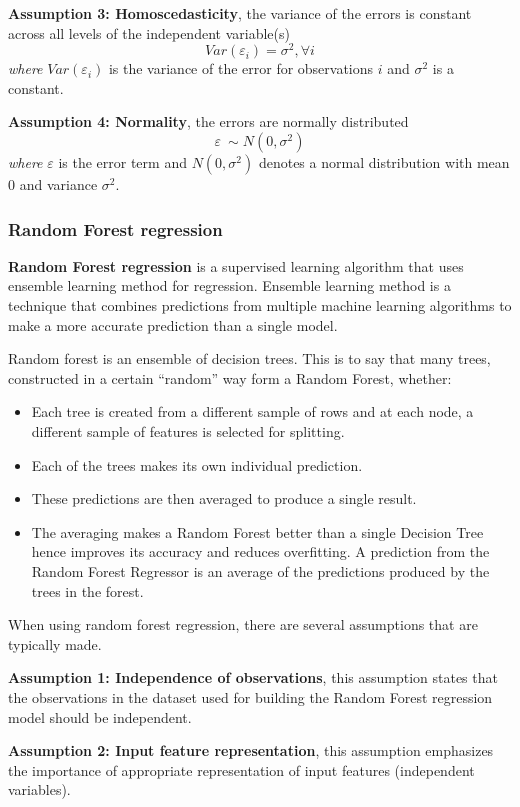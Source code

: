 \textbf{Assumption 3: Homoscedasticity}, the variance of the errors is constant across all levels of the independent variable(s)
$$
Var({\varepsilon}_{i})=\sigma ^{2},\forall i
$$
\textit{where} $Var({\varepsilon}_{i})$ is the variance of the error for observations $i$ and $\sigma ^{2}$ is a constant.

\textbf{Assumption 4: Normality}, the errors are normally distributed
$$
\varepsilon ~ \sim N(0,\sigma ^{2})
$$
\textit{where} $\varepsilon$ is the error term and $N(0,\sigma ^{2})$ denotes a normal distribution with mean 0 and variance $\sigma ^{2}$.
\subsubsection{Random Forest regression}
\textbf{Random Forest regression} is a supervised learning algorithm that uses ensemble learning method for regression. Ensemble learning method is a technique that combines predictions from multiple machine learning algorithms to make a more accurate prediction than a single model.

Random forest is an ensemble of decision trees. This is to say that many trees, constructed in a certain “random” way form a Random Forest, whether:
\begin{itemize}
    \item Each tree is created from a different sample of rows and at each node, a different sample of features is selected for splitting.
    \item Each of the trees makes its own individual prediction.
    \item These predictions are then averaged to produce a single result.
    \item The averaging makes a Random Forest better than a single Decision Tree hence improves its accuracy and reduces overfitting. A prediction from the Random Forest Regressor is an average of the predictions produced by the trees in the forest.
\end{itemize}

When using random forest regression, there are several assumptions that are typically made.

\textbf{Assumption 1: Independence of observations},  this assumption states that the observations in the dataset used for building the Random Forest regression model should be independent.

\textbf{Assumption 2: Input feature representation}, this assumption emphasizes the importance of appropriate representation of input features (independent variables).

